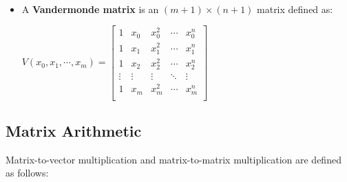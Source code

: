\begin{tcolorbox}[title={\textbf{\tboxdef{\ref*{subsec:vandermonde}} Matrices}}]
\begin{itemize}
$ $


\item A \textbf{Vandermonde matrix} is an $(m + 1) \times (n + 1)$ matrix defined as:

$V(x_0, x_1, \cdots, x_{m}) = \begin{bmatrix}
1 & x_0 & x_0^2 & \cdots & x_0^n\\
1 & x_1 & x_1^2 & \cdots & x_1^n \\
1 & x_2 & x_2^2 & \cdots & x_2^n \\
\vdots & \vdots & \vdots & \ddots & \vdots \\
1 & x_m & x_m^2 & \cdots & x_m^{n} \\
\end{bmatrix}$


\end{itemize}

\end{tcolorbox}


 





\subsection{Matrix Arithmetic}
\label{subsec:matrix-arithmetic}


Matrix-to-vector multiplication and matrix-to-matrix multiplication are defined as follows:




